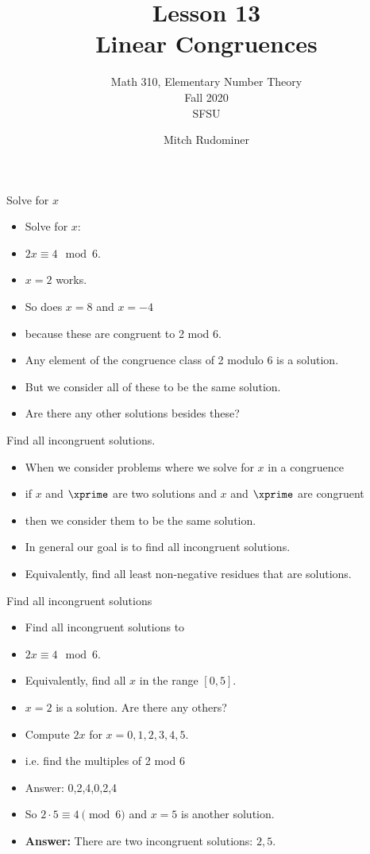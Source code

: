 \documentclass{beamer}
\title{Lesson 13 \\ Linear Congruences}
\subtitle{Math 310, Elementary Number Theory \\ Fall 2020 \\ SFSU}
\author{Mitch Rudominer}
\date{}
\begin{document}
\begin{frame}
  \titlepage
\end{frame}

\begin{frame}{Solve for $x$}

\begin{itemize}
  \item Solve for $x$:
  \item $2x  \equiv 4 \mod 6$.
  \item $x=2$ works.
  \item So does $x=8$ and $x=-4$
  \item because these are congruent to 2 mod 6.
  \item Any element of the congruence class of 2 modulo 6 is a solution.
  \item But we consider all of these to be the same solution.
  \item Are there any other solutions besides these?
\end{itemize}

\end{frame}

\begin{frame}{Find all incongruent solutions.}

\begin{itemize}
  \item When we consider problems where we solve for $x$ in a congruence
  \item if $x$ and $\xprime$ are two solutions and $x$ and $\xprime$ are congruent
  \item then we consider them to be the same solution.
  \item In general our goal is to find all incongruent solutions.
  \item Equivalently, find all least non-negative residues that are solutions.
\end{itemize}

\end{frame}


\begin{frame}{Find all incongruent solutions}
\begin{itemize}
  \item Find all incongruent solutions to
  \item $2x  \equiv 4 \mod 6$.
  \item Equivalently, find all $x$ in the range $[0,5]$.
  \item $x=2$ is a solution. Are there any others?
  \item Compute $2x$ for $x=0,1,2,3,4,5$.
  \item i.e. find the multiples of 2 mod 6
  \item Answer: 0,2,4,0,2,4
  \item So $2\cdot 5 \equiv 4 \pmod 6$ and $x=5$ is another solution.
  \item \textbf{Answer:} There are two incongruent solutions: $2,5$.
\end{itemize}
\end{frame}
\end{document}
